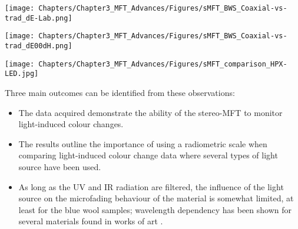 \begin{figure*}[!h]
\centering
\texttt{[image: Chapters/Chapter3\_MFT\_Advances/Figures/sMFT\_BWS\_Coaxial-vs-trad\_dE-Lab.png]}
\caption[\hspace{0.3cm}MFT data - traditional vs co-axial mode]{Microfading results ; comparing the traditional vs the co-axial mode: (a) \dEOO curves; (b) variations in the CIE $L^*a^*b^*$ coordinates.}
\label{fig:sMFT_BWS-results_modes}
\end{figure*}



\begin{figure*}[!h]
\centering
\texttt{[image: Chapters/Chapter3\_MFT\_Advances/Figures/sMFT\_BWS\_Coaxial-vs-trad\_dE00dH.png]}
\caption[\hspace{0.3cm}MTF data - traditional vs co-axial mode - 1\textsuperscript{st} derivative]{Microfading results comparing the traditional vs the co-axial mode - 1\textsuperscript{st} derivative values of Figure \ref{fig:sMFT_BWS-results_modes} - a.}
\label{fig:sMFT_BWS-results_modes_deriv}
\end{figure*}



\begin{figure*}[!h]
\centering
\texttt{[image: Chapters/Chapter3\_MFT\_Advances/Figures/sMFT\_comparison\_HPX-LED.jpg]}
\caption[\hspace{0.3cm}MFT data traditional mode - HPX vs LED]{Microfading results with the traditional mode ; comparison between the HPX and the LED lamp: \dEOO curves (a); variations in the CIE $L^*a^*b^*$ coordinates (b).}
\label{fig:sMFT_BWS_comparison_HPX-LED}
\end{figure*}


Three main outcomes can be identified from these observations:
\begin{itemize}
    \item The data acquired demonstrate the ability of the stereo-MFT to monitor light-induced colour changes.
    \item The results outline the importance of using a radiometric scale when comparing light-induced colour change data where several types of light source have been used.
    \item As long as the \gls{UV} and \gls{IR} radiation are filtered, the influence of the light source on the microfading behaviour of the material is somewhat limited, at least for the blue wool samples; wavelength dependency has been shown for several materials found in works of art \citep{lerwill_micro-fading_2015, saunders_light-induced_1994}.\\
\end{itemize}



